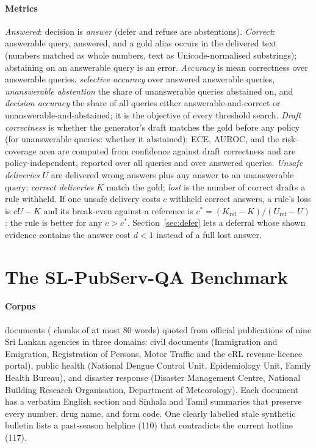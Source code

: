 \paragraph{Metrics}\label{sec:metrics} \emph{Answered}: decision is \emph{answer} (defer and refuse are abstentions). \emph{Correct}: answerable query, answered, and a gold alias occurs in the delivered text (numbers matched as whole numbers, text as Unicode-normalised substrings); abstaining on an answerable query is an error. \emph{Accuracy} is mean correctness over answerable queries, \emph{selective accuracy} over answered answerable queries, \emph{unanswerable abstention} the share of unanswerable queries abstained on, and \emph{decision accuracy} the share of all queries either answerable-and-correct or unanswerable-and-abstained; it is the objective of every threshold search. \emph{Draft correctness} is whether the generator's draft matches the gold before any policy (for unanswerable queries: whether it abstained); ECE, AUROC, and the risk--coverage area are computed from confidence against draft correctness and are policy-independent, reported over all queries and over answered queries. \emph{Unsafe deliveries} $U$ are delivered wrong answers plus any answer to an unanswerable query; \emph{correct deliveries} $K$ match the gold; \emph{lost} is the number of correct drafts a rule withheld. If one unsafe delivery costs $c$ withheld correct answers, a rule's loss is $cU-K$ and its break-even against a reference is $c^*=(K_{\mathrm{ref}}-K)/(U_{\mathrm{ref}}-U)$: the rule is better for any $c>c^*$. Section~\ref{sec:defer} lets a deferral whose shown evidence contains the answer cost $d<1$ instead of a full lost answer.

\section{The SL-PubServ-QA Benchmark}\label{sec:benchmark}
\paragraph{Corpus} \Lndocs{} documents (\Lnchunks{} chunks of at most 80 words) quoted from official publications of nine Sri Lankan agencies in three domains: civil documents (Immigration and Emigration, Registration of Persons, Motor Traffic and the eRL revenue-licence portal), public health (National Dengue Control Unit, Epidemiology Unit, Family Health Bureau), and disaster response (Disaster Management Centre, National Building Research Organisation, Department of Meteorology). Each document has a verbatim English section and Sinhala and Tamil summaries that preserve every number, drug name, and form code. One clearly labelled stale synthetic bulletin lists a past-season helpline (110) that contradicts the current hotline (117).


